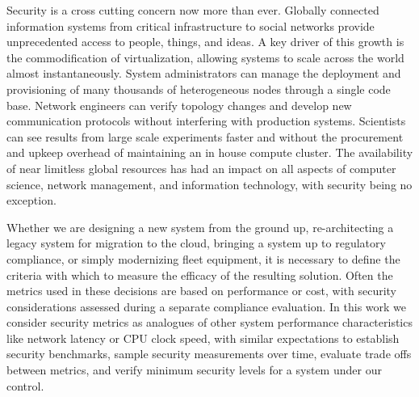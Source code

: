 



Security is a cross cutting concern now more than ever. Globally connected information systems from critical infrastructure to social networks provide unprecedented access to people, things, and ideas. A key driver of this growth is the commodification of virtualization, allowing systems to scale across the world almost instantaneously. System administrators can manage the deployment and provisioning of many thousands of heterogeneous nodes through a single code base. Network engineers can verify topology changes and develop new communication protocols without interfering with production systems. Scientists can see results from large scale experiments faster and without the procurement and upkeep overhead of maintaining an in house compute cluster. The availability of near limitless global resources has had an impact on all aspects of computer science, network management, and information technology, with security being no exception.

Whether we are designing a new system from the ground up, re-architecting a legacy system for migration to the cloud, bringing a system up to regulatory compliance, or simply modernizing fleet equipment, it is necessary to define the criteria with which to measure the efficacy of the resulting solution. Often the metrics used in these decisions are based on performance or cost, with security considerations assessed during a separate compliance evaluation. In this work we consider security metrics as analogues of other system performance characteristics like network latency or CPU clock speed, with similar expectations to establish security benchmarks, sample security measurements over time, evaluate trade offs between metrics, and verify minimum security levels for a system under our control. 


